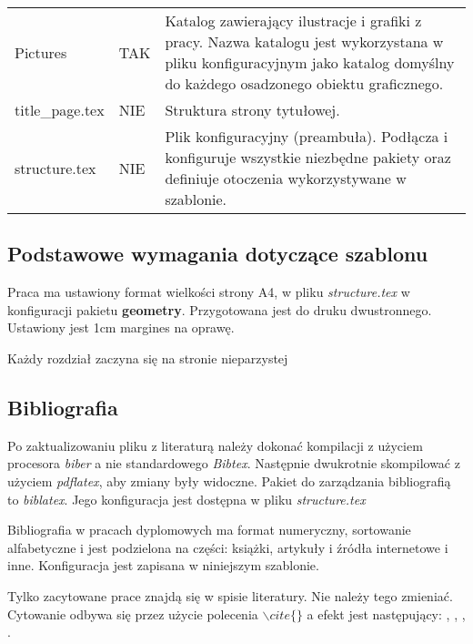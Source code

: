 \begin{table}[h]
\begin{tabular}{p{}|p{} | p{}}
        Pictures             & TAK             & Katalog zawierający ilustracje i grafiki z pracy. Nazwa katalogu jest wykorzystana w pliku konfiguracyjnym jako katalog domyślny do każdego osadzonego obiektu graficznego. \\
        title\_page.tex      & NIE             & Struktura strony tytułowej.                                                                                                                                                 \\
        structure.tex        & NIE             & Plik konfiguracyjny (preambuła). Podłącza i konfiguruje wszystkie niezbędne pakiety oraz definiuje otoczenia wykorzystywane w szablonie.                                    \\
        \bottomrule
    \end{tabular}
    \label{tab:1}
\end{table}

\subsection{Podstawowe wymagania dotyczące szablonu}

Praca ma ustawiony format wielkości strony A4, w pliku {\em structure.tex} w konfiguracji pakietu {\bf geometry}. Przygotowana jest do druku dwustronnego. Ustawiony jest 1cm margines na oprawę.

 Każdy rozdział zaczyna się na stronie nieparzystej

\subsection{Bibliografia}

Po zaktualizowaniu pliku z literaturą należy dokonać kompilacji z użyciem procesora {\em biber} a nie standardowego  {\em Bibtex}. Następnie dwukrotnie skompilować z użyciem {\em pdflatex}, aby zmiany były widoczne. Pakiet do zarządzania bibliografią to {\em biblatex}. Jego konfiguracja jest dostępna w pliku {\em structure.tex}

Bibliografia w pracach dyplomowych ma format numeryczny, sortowanie alfabetyczne i jest podzielona na części: książki, artykuły i źródła internetowe i inne. Konfiguracja jest zapisana w niniejszym szablonie.

Tylko zacytowane prace znajdą się w spisie literatury. Nie należy tego zmieniać. Cytowanie odbywa się przez użycie polecenia $\backslash cite\{\}$ a efekt jest następujący: \cite{book_key}, \cite{article_key}, \cite{lam1994}, \cite{knuthwebsite}.





